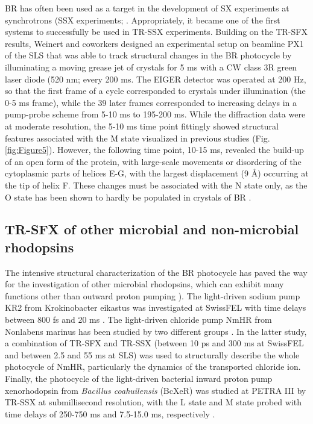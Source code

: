 BR has often been used as a target in the development of SX experiments at synchrotrons (SSX experiments; \cite{noglyLipidicCubicPhase2015, zanderMeshAndCollectAutomatedMulticrystal2015}. Appropriately, it became one of the first systems to successfully be used in TR-SSX experiments. Building on the TR-SFX results, Weinert and coworkers designed an experimental setup on beamline PX1 of the SLS that was able to track structural changes in the BR photocycle by illuminating a moving grease jet of crystals for 5 ms with a CW class 3R green laser diode (520 nm; \cite{weinertProtonUptakeMechanism2019} every 200 ms. The EIGER detector was operated at 200 Hz, so that the first frame of a cycle corresponded to crystals under illumination (the 0-5 ms frame), while the 39 later frames corresponded to increasing delays in a pump-probe scheme from 5-10 ms to 195-200 ms. While the diffraction data were at moderate resolution, the 5-10 ms time point fittingly showed structural features associated with the M state visualized in previous studies (Fig. \ref{fig:Figure5}). However, the following time point, 10-15 ms, revealed the build-up of an open form of the protein, with large-scale movements or disordering of the cytoplasmic parts of helices E-G, with the largest displacement (9 \AA) occurring at the tip of helix F. These changes must be associated with the N state only, as the O state has been shown to hardly be populated in crystals of BR \parencite{efremovPhysicalDetwinningHemihedrally2004}.

\subsection{TR-SFX of other microbial and non-microbial rhodopsins}

The intensive structural characterization of the BR photocycle has paved the way for the investigation of other microbial rhodopsins, which can exhibit many functions other than outward proton pumping \parencite{rozenbergMicrobialRhodopsinsLast2021}). The light-driven sodium pump KR2 from Krokinobacter eikastus was investigated at SwissFEL with time delays between 800 fs and 20 ms \parencite{skopintsevFemtosecondtomillisecondStructuralChanges2020}. The light-driven chloride pump NmHR from Nonlabens marinus has been studied by two different groups \parencite{yunEarlystageDynamicsChloride2021,mousDynamicsMechanismLightdriven2022}. In the latter study, a combination of TR-SFX and TR-SSX (between 10 ps and 300 ms at SwissFEL and between 2.5 and 55 ms at SLS) was used to structurally describe the whole photocycle of NmHR, particularly the dynamics of the transported chloride ion. Finally, the photocycle of the light-driven bacterial inward proton pump xenorhodopsin from \textit{Bacillus coahuilensis} (BcXeR) was studied at PETRA III by TR-SSX at submillisecond resolution, with the L state and M state probed with time delays of 250-750 ms and 7.5-15.0 ms, respectively \parencite{kovalevMechanismsInwardTransmembrane2023}. 

